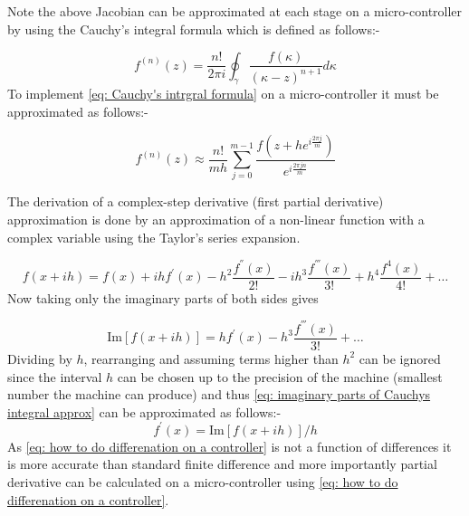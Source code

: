 Note the above Jacobian can be approximated at each stage on a micro-controller by using the Cauchy’s integral
formula which is defined as follows\cite{Jacobain_approx_paper}:-


\begin{equation}
f^{(n)}(z) = \frac{n!}{2\pi i}\oint_\gamma \frac{f(\kappa)}{(\kappa - z)^{n+1}}d\kappa \label{eq: Cauchy's intrgral formula}
\end{equation}
To implement \eqref{eq: Cauchy's intrgral formula} on a micro-controller it must be approximated as follows:-

\begin{equation}
f^{(n)}(z) \approx \frac{n!}{mh} \sum_{j=0}^{m-1}\frac{f(z+h e^{i\frac{2 \pi j}{m}})}{e^{i\frac{2 \pi j n}{m}}}
\end{equation}

The derivation of a complex-step derivative (first partial derivative) approximation is done by an approximation of a non-linear function with a complex variable using the Taylor's series expansion.

\begin{equation}
f(x+ih) = f(x) + ihf^{'} (x) - h^2\frac{f^{''}(x)}{2!}- ih^3\frac{f^{'''}(x)}{3!}+h^4\frac{f^{4}(x)}{4!} + \dots
\end{equation}
Now taking only the imaginary parts of both sides gives

\begin{equation}
\mathrm{Im}[f(x+ih)] = hf^{'}(x) - h^3\frac{f^{'''}(x)}{3!}+\dots \label{eq: imaginary parts of  Cauchys integral approx}
\end{equation}
Dividing by $h$, rearranging and assuming terms higher than $h^2$ can be ignored since the interval $h$ can be chosen up to the precision of the machine (smallest number the machine can produce) and thus \eqref{eq: imaginary parts of  Cauchys integral approx} can be approximated as follows:-
\begin{equation}
f^{'}(x) = \mathrm{Im}[f(x+ih)]/h \label{eq: how to do differenation on a controller}
\end{equation}
As \eqref{eq: how to do differenation on a controller} is not a function of differences it is more accurate than standard finite difference and more importantly partial derivative can be calculated on a micro-controller using \eqref{eq: how to do differenation on a controller}. 

